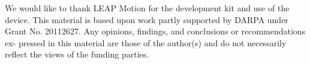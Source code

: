 We would like to thank LEAP Motion for the development kit and use of the device. This material is based upon work partly supported by DARPA under Grant No. 20112627. Any opinions, findings, and conclusions or recommendations ex- pressed in this material are those of the author(s) and do not necessarily reflect the views of the funding parties.

